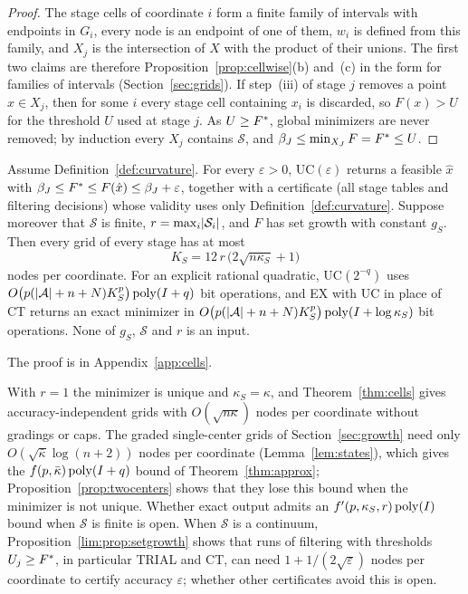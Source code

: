 \begin{proof}
The stage cells of coordinate $i$ form a finite family of intervals with
endpoints in $G_i$, every node is an endpoint of one of them, $w_i$ is
defined from this family, and $X_j$ is the intersection of $X$ with the
product of their unions. The first two claims are therefore
Proposition~\ref{prop:cellwise}(b) and~(c) in the form for families of
intervals (Section~\ref{sec:grids}). If step~(iii) of stage $j$ removes a
point $x\in X_j$, then for some $i$ every stage cell containing $x_i$ is
discarded, so $F(x)>U$ for the threshold $U$ used at stage $j$. As
$U\ge F^{*}$, global minimizers are never removed; by induction every $X_j$
contains $\mathcal S$, and $\beta_J\le\min_{X_J}F=F^{*}\le U$.
\end{proof}

\begin{theorem}\label{thm:cells}
Assume Definition~\ref{def:curvature}. For every $\varepsilon>0$,
UC$(\varepsilon)$ returns a feasible $\hat x$ with
$\beta_J\le F^{*}\le F(\hat x)\le\beta_J+\varepsilon$, together with a
certificate (all stage tables and filtering decisions) whose validity uses
only Definition~\ref{def:curvature}. Suppose moreover that $\mathcal S$ is
finite, $r=\max_i\lvert \mathcal S_i\rvert$, and $F$ has set growth with constant
$g_S$. Then every grid of every stage has at most
\begin{equation}\label{eq:cellcount}
K_S=12\,r\,\bigl(2\sqrt{n\kappa_S}+1\bigr)
\end{equation}
nodes per coordinate. For an explicit rational quadratic, UC$(2^{-q})$ uses
$O\bigl(p(\lvert \mathcal A\rvert+n+N)K_S^p\bigr)\operatorname{poly}(I+q)$ bit operations, and
EX with UC in place of CT returns an exact minimizer in
$O\bigl(p(\lvert \mathcal A\rvert+n+N)K_S^p\bigr)\operatorname{poly}(I+\log\kappa_S)$ bit
operations. None of $g_S$, $\mathcal S$ and $r$ is an input.
\end{theorem}

The proof is in Appendix~\ref{app:cells}.

\begin{remark}\label{rem:grading}
With $r=1$ the minimizer is unique and $\kappa_S=\kappa$, and
Theorem~\ref{thm:cells} gives accuracy-independent grids with
$O(\sqrt{n\kappa})$ nodes per coordinate without gradings or caps. The graded
single-center grids of Section~\ref{sec:growth} need only
$O(\sqrt{\bar\kappa}\log(n+2))$ nodes per coordinate (Lemma~\ref{lem:states}),
which gives the $f(p,\bar\kappa)\operatorname{poly}(I+q)$ bound of
Theorem~\ref{thm:approx}; Proposition~\ref{prop:twocenters} shows that they
lose this bound when the minimizer is not unique. Whether exact output admits
an $f'(p,\kappa_S,r)\operatorname{poly}(I)$ bound when $\mathcal S$ is finite is open. When
$\mathcal S$ is a continuum, Proposition~\ref{lim:prop:setgrowth} shows that
runs of filtering with thresholds $U_j\ge F^{*}$, in particular TRIAL and CT,
can need $1+1/(2\sqrt\varepsilon)$ nodes per coordinate to certify accuracy
$\varepsilon$; whether other certificates avoid this is open.
\end{remark}


